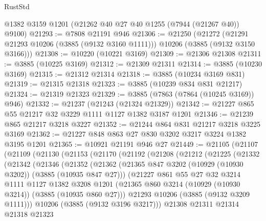 \begin{lexlean}{RustStd}
\begin{coremodule}
    @1382
    @3159
    @1201
    (@21262 @40 @27 @40 @1255 (@7944 (@21267 @40)) @9100)
@21293 := @7808 @21191 @946
@21306 := @21250
    (@21272 (@21291 @21293 @10206 (@3885 (@9132 @3160 @1111))) @10206 (@3885 (@9132 @3150 @3166)))
@21308 := @10220 (@10221 @3169)
@21309 := @21306 @21308
@21311 := @3885 (@10225 @3169)
@21312 := @21309 @21311
@21314 := @3885 (@10230 @3169)
@21315 := @21312 @21314
@21318 := @3885 (@10234 @3169 @831)
@21319 := @21315 @21318
@21323 := @3885 (@10239 @834 @831 @21217)
@21324 := @21319 @21323
@21329 := @3885 (@7863 (@7864 (@10245 @3169)) @946)
@21332 := @21237 (@21243 (@21324 @21329))
@21342 := @21227 @865 @55 @21217 @32 @3229 @1111 @1127 @1382 @3187 @1201
@21346 := @21239 @865 @21217 @3218 @3227
@21352 := @21244 @864 @831 @21217 @3218 @3225 @3169
@21362 := @21227 @848 @863 @27 @830 @3202 @3217 @3224 @1382 @3195 @1201
@21365 := @10921 @21191 @946 @27
@21449 := @21105
    (@21107
      (@21109
        (@21130
          (@21153
            (@21170
              (@21192
                (@21208
                  (@21212
                    (@21225
                      (@21332
                        (@21342
                          (@21346
                            (@21352
                              (@21362
                                (@21365
                                  @847
                                  @3202
                                  (@10929 (@10930 @3202))
                                  (@3885 (@10935 @847 @27)))
                                (@21227
                                  @861
                                  @55
                                  @27
                                  @32
                                  @3214
                                  @1111
                                  @1127
                                  @1382
                                  @3208
                                  @1201
                                  (@21365
                                    @860
                                    @3214
                                    (@10929 (@10930 @3214))
                                    (@3885 (@10935 @860 @27)))
                                  @21293
                                  @10206
                                  (@3885 (@9132 @3209 @1111)))
                                @10206
                                (@3885 (@9132 @3196 @3217)))
                              @21308
                              @21311
                              @21314
                              @21318
                              @21323

\end{coremodule}
\end{lexlean}
